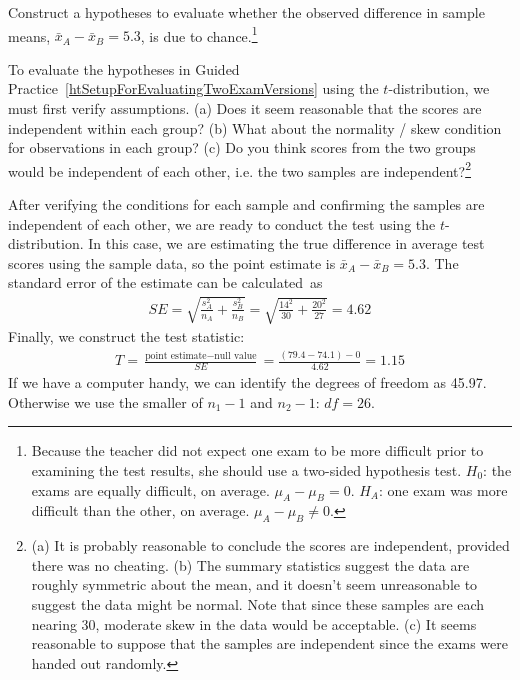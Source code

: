 {\begin{exercise} \label{htSetupForEvaluatingTwoExamVersions}
Construct a hypotheses to evaluate whether the observed difference in sample means, $\bar{x}_A - \bar{x}_B=5.3$, is due to chance.\footnote{Because the teacher did not expect one exam to be more difficult prior to examining the test results, she should use a two-sided hypothesis test. $H_0$: the exams are equally difficult, on average. $\mu_A - \mu_B = 0$. $H_A$: one exam was more difficult than the other, on average. $\mu_A - \mu_B \neq 0$.}
\end{exercise}

\begin{exercise} \label{conditionsForTDistForEvaluatingTwoExamVersions}
To evaluate the hypotheses in Guided Practice~\ref{htSetupForEvaluatingTwoExamVersions} using the $t$-distribution, we must first verify assumptions. (a) Does it seem reasonable that the scores are independent within each group? (b) What about the normality / skew condition for observations in each group? (c) Do you think scores from the two groups would be independent of each other, i.e. the two samples are independent?\footnote{(a) It is probably reasonable to conclude the scores are independent, provided there was no cheating. (b) The summary statistics suggest the data are roughly symmetric about the mean, and it doesn't seem unreasonable to suggest the data might be normal. Note that since these samples are each nearing 30, moderate skew in the data would be acceptable. (c) It seems reasonable to suppose that the samples are independent since the exams were handed out randomly.}
\end{exercise}

After verifying the conditions for each sample and confirming the samples are independent of each other, we are ready to conduct the test using the $t$-distribution. In this case, we are estimating the true difference in average test scores using the sample data, so the point estimate is $\bar{x}_A - \bar{x}_B = 5.3$. The standard error of the estimate can be calculated~as
\begin{eqnarray*}
SE = \sqrt{\frac{s_A^2}{n_A} + \frac{s_B^2}{n_B}} = \sqrt{\frac{14^2}{30} + \frac{20^2}{27}} = 4.62
\end{eqnarray*}
Finally, we construct the test statistic:
\begin{eqnarray*}
T = \frac{\text{point estimate} - \text{null value}}{SE} = \frac{(79.4-74.1) - 0}{4.62} = 1.15
\end{eqnarray*}
If we have a computer handy, we can identify the degrees of freedom as 45.97. Otherwise we use the smaller of $n_1-1$ and $n_2-1$: $df=26$. 

}
